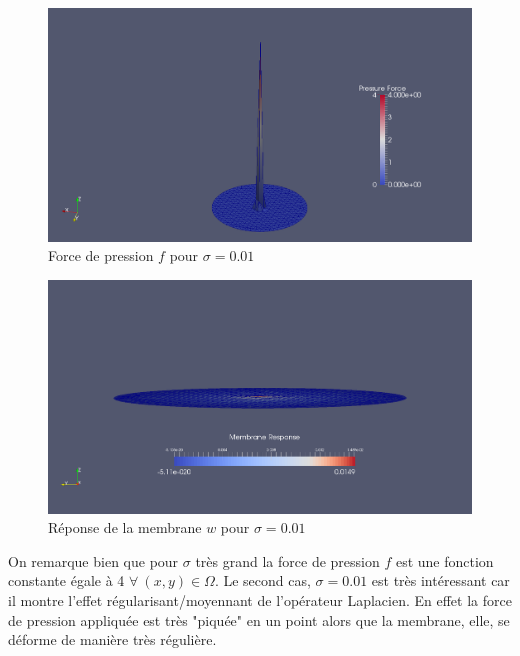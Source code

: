 \documentclass[a4paper,oneside,10pt]{report}
\begin{document}
\begin{figure}[!h]
\begin{center}	
\includegraphics[width=\textwidth]{pressure_sig001.png}
\caption{\label{fig1}Force de pression $f$ pour $\sigma = 0.01$} 
\end{center}
\end{figure}

\begin{figure}[!h]
\begin{center}	
\includegraphics[width=\textwidth]{w_sig001.png}
\caption{\label{fig1}Réponse de la membrane $w$ pour $\sigma = 0.01$} 
\end{center}
\end{figure}

On remarque bien que pour $\sigma$ très grand la force de pression $f$ est une fonction constante égale à 4 $\forall\ (x,y) \in \Omega$. Le second cas, $\sigma = 0.01$ est très intéressant car il montre l'effet régularisant/moyennant de l'opérateur Laplacien. En effet la force de pression appliquée est très "piquée" en un point alors que la membrane, elle, se déforme de manière très régulière.
\end{document}
